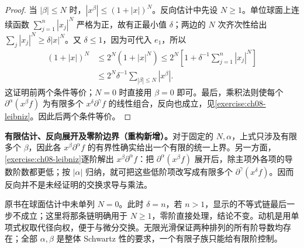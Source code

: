 \documentclass[../../main.tex]{subfiles}
\begin{document}
\begin{proof}
当 $|\beta|\leqslant N$ 时，$|x^\beta|\leqslant(1+|x|)^N$。反向估计中先设 $N\geqslant1$。单位球面上连续函数 $\sum_{j=1}^n|x_j|^N$ 严格为正，故有正最小值 $\delta$；两边的 $N$ 次齐次性给出 $\sum_j|x_j|^N\geqslant\delta|x|^N$。又 $\delta\leqslant1$，因为可代入 $e_1$，所以
\begin{align*}
(1+|x|)^N
&\leqslant2^N(1+|x|^N)
\leqslant2^N\left[1+\delta^{-1}\sum_{j=1}^n|x_j|^N\right]\\
&\leqslant2^N\delta^{-1}\sum_{|\beta|\leqslant N}|x^\beta|.
\end{align*}
这证明前两个条件等价；$N=0$ 时直接用 $\beta=0$ 即可。最后，乘积法则使每个 $\partial^\alpha(x^\beta f)$ 为有限多个 $x^\delta\partial^\gamma f$ 的线性组合，反向也成立，见\cref{exercise:ch08-leibniz}。因此后两个条件等价。
\end{proof}
\begin{remark}
\textbf{有限估计、反向展开及零阶边界（重构新增）。}对于固定的 $N,\alpha$，上式只涉及有限多个 $\beta$，因此各 $x^\beta\partial^\alpha f$ 的有界性确实给出一个有限的统一上界。另一方面，\cref{exercise:ch08-leibniz}逐阶解出 $x^\beta\partial^\alpha f$：把 $\partial^\alpha(x^\beta f)$ 展开后，除主项外各项的导数阶数都更低；按 $|\alpha|$ 归纳，就可把这些低阶项改写成有限多个 $\partial^\gamma(x^\delta f)$。因而反向并不是未经证明的交换求导与乘法。

原书在球面估计中未单列 $N=0$。此时 $\delta=n$，若 $n>1$，显示的不等式链最后一步不成立；这里将那条链明确用于 $N\geqslant1$，零阶直接处理，结论不变。动机是用单项式权取代径向权，便于与微分交换。无限光滑保证两种排列的所有阶导数均存在；全部 $\alpha,\beta$ 是整体 Schwartz 性的要求，一个有限子族只能给有限阶控制。
\end{remark}

\end{document}
